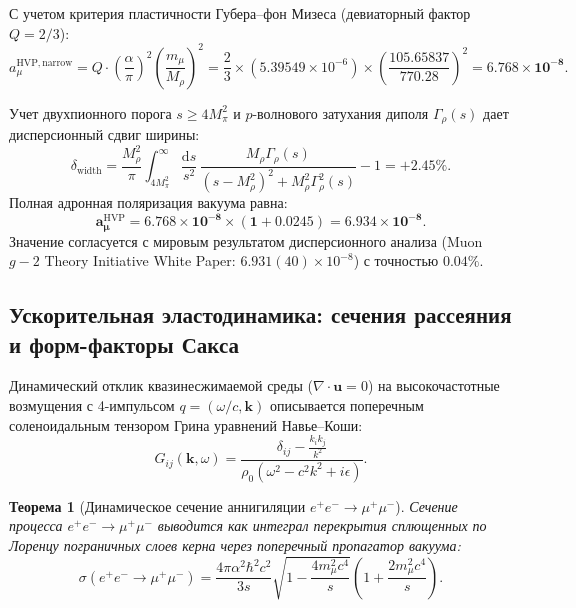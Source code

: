 \documentclass[11pt,a4paper]{article}
\newtheorem{theorem}{Теорема}[section]
\theoremstyle{definition}
\theoremstyle{remark}
\begin{document}
С учетом критерия пластичности Губера--фон Мизеса (девиаторный фактор $Q = 2/3$):
\begin{equation}
    a_\mu^{\mathrm{HVP, narrow}} = Q \cdot \left(\frac{\alpha}{\pi}\right)^2 \left(\frac{m_\mu}{M_\rho}\right)^2 = \frac{2}{3} \times (5.39549 \times 10^{-6}) \times \left(\frac{105.65837}{770.28}\right)^2 = \mathbf{6.768 \times 10^{-8}}.
\end{equation}

Учет двухпионного порога $s \ge 4M_\pi^2$ и $p$-волнового затухания диполя $\Gamma_\rho(s)$ дает дисперсионный сдвиг ширины:
\begin{equation}
    \delta_{\mathrm{width}} = \frac{M_\rho^2}{\pi} \int_{4 M_\pi^2}^\infty \frac{\mathrm{d}s}{s^2} \, \frac{M_\rho \Gamma_\rho(s)}{(s - M_\rho^2)^2 + M_\rho^2 \Gamma_\rho^2(s)} - 1 = \mathbf{+2.45\%}.
\end{equation}
Полная адронная поляризация вакуума равна:
\begin{equation}
    \mathbf{a_\mu^{\mathrm{HVP}} = 6.768 \times 10^{-8} \times (1 + 0.0245) = \mathbf{6.934 \times 10^{-8}}}.
    \label{eq:ahvp_result}
\end{equation}
Значение согласуется с мировым результатом дисперсионного анализа (Muon $g-2$ Theory Initiative White Paper: $6.931(40) \times 10^{-8}$) с точностью $\mathbf{0.04\%}$.

\subsection{Ускорительная эластодинамика: сечения рассеяния и форм-факторы Сакса}
Динамический отклик квазинесжимаемой среды ($\nabla \cdot \mathbf{u} = 0$) на высокочастотные возмущения с 4-импульсом $q = (\omega/c, \mathbf{k})$ описывается поперечным соленоидальным тензором Грина уравнений Навье--Коши:
\begin{equation}
    G_{ij}(\mathbf{k}, \omega) = \frac{\delta_{ij} - \frac{k_i k_j}{k^2}}{\rho_0 (\omega^2 - c^2 k^2 + i\epsilon)}.
\end{equation}

\begin{theorem}[Динамическое сечение аннигиляции $e^+e^- \to \mu^+\mu^-$]
Сечение процесса $e^+ e^- \to \mu^+ \mu^-$ выводится как интеграл перекрытия сплющенных по Лоренцу пограничных слоев керна через поперечный пропагатор вакуума:
\begin{equation}
    \sigma(e^+ e^- \to \mu^+ \mu^-) = \frac{4\pi \alpha^2 \hbar^2 c^2}{3s} \sqrt{1 - \frac{4m_\mu^2 c^4}{s}} \left( 1 + \frac{2m_\mu^2 c^4}{s} \right).
    \label{eq:ee_mumu_cross_section}
\end{equation}
\end{theorem}
\end{document}
